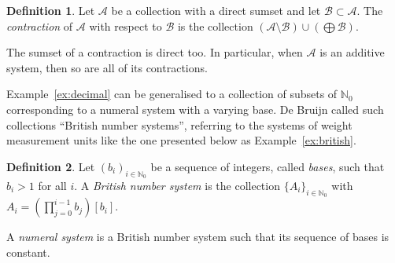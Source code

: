 \documentclass[12pt]{article}
\theoremstyle{definition}
\newtheorem{definition}{Definition}
\newcommand{\N}{\mathbb{N}}
\begin{document}
\begin{definition}
\label{def:contraction}
Let $\mathcal{A}$ be a collection with a direct sumset and let $\mathcal{B}\subset\mathcal{A}$. The \emph{contraction} of $\mathcal{A}$ with respect to $\mathcal{B}$ is the collection
 $\left(\mathcal{A}\setminus\mathcal{B}\right)\cup\left(\bigoplus\mathcal{B}\right)$.
\end{definition}
The sumset of a contraction is direct too. In particular, when $\mathcal{A}$ is an additive system, then so are all of its contractions.

Example~\ref{ex:decimal} can be generalised to a collection of subsets of $\N_0$ corresponding to a numeral system with a varying base. De Bruijn called such collections ``British number systems'', referring to the systems of weight measurement units like the one presented below as Example~\ref{ex:british}.
\begin{definition}
\label{def:british}
Let $(b_i)_{i\in\N_0}$ be a sequence of integers, called \emph{bases}, such that $b_i>1$ for all $i$.
A \emph{British number system} is the collection $\{A_i\}_{i\in\N_0}$ with $A_i=\left(\prod_{j=0}^{i-1}b_j\right) [b_i]$.

A \emph{numeral system} is a British number system such that its sequence of bases is constant.
\end{definition}
\end{document}
